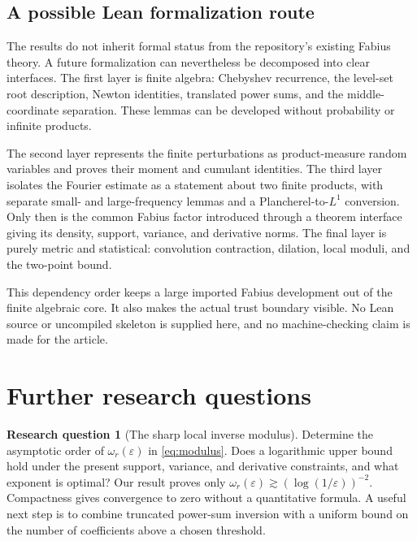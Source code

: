 \documentclass[11pt,a4paper]{article}
\theoremstyle{definition}
\newtheorem{question}{Research question}
\theoremstyle{remark}
\newcommand{\eps}{\varepsilon}
\begin{document}
\subsection{A possible Lean formalization route}

The results do not inherit formal status from the repository's existing
Fabius theory. A future formalization can nevertheless be decomposed into
clear interfaces. The first layer is finite algebra: Chebyshev recurrence,
the level-set root description, Newton identities, translated power sums,
and the middle-coordinate separation. These lemmas can be developed
without probability or infinite products.

The second layer represents the finite perturbations as product-measure
random variables and proves their moment and cumulant identities. The
third layer isolates the Fourier estimate as a statement about two finite
products, with separate small- and large-frequency lemmas and a
Plancherel-to-$L^1$ conversion. Only then is the common Fabius factor
introduced through a theorem interface giving its density, support,
variance, and derivative norms. The final layer is purely metric and
statistical: convolution contraction, dilation, local moduli, and the
two-point bound.

This dependency order keeps a large imported Fabius development out of
the finite algebraic core. It also makes the actual trust boundary
visible. No Lean source or uncompiled skeleton is supplied here, and no
machine-checking claim is made for the article.

\section{Further research questions}
\label{sec:questions}

\begin{question}[The sharp local inverse modulus]
Determine the asymptotic order of $\omega_r(\eps)$ in
\eqref{eq:modulus}. Does a logarithmic upper bound hold under the present
support, variance, and derivative constraints, and what exponent is
optimal? Our result proves only
$\omega_r(\eps)\gtrsim(\log(1/\eps))^{-2}$. Compactness gives convergence
to zero without a quantitative formula. A useful next step is to combine
truncated power-sum inversion with a uniform bound on the number of
coefficients above a chosen threshold.
\end{question}
\end{document}
